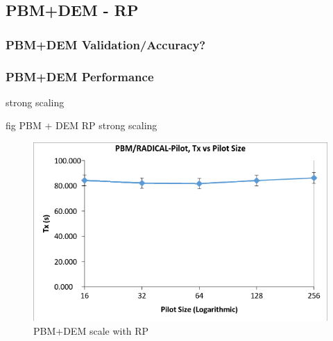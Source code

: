 \documentclass[preprint,11pt,authoryear]{elsarticle}
\begin{document}
	    
	  \subsection{PBM+DEM - RP} 
	    \subsubsection{PBM+DEM Validation/Accuracy?}
	   
	    
	    \subsubsection{PBM+DEM Performance}
	    \par strong scaling
	    \par fig PBM + DEM RP strong scaling 
	      \begin{figure}[!htb]
	      \centering
	      \includegraphics[scale=0.5]{rslts_pbmbyrp_strng}
	      \caption{PBM+DEM scale with RP}
	      \label{fig:rslts_dembyRP_strng}
	      \end{figure}
	
	
	
\end{document}
